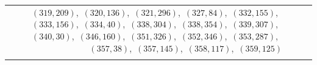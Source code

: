 \documentclass[11pt]{article}
\begin{document}
\begin{longtable}{@{}rrl>{\raggedright\arraybackslash}p{}@{}}
$(319,209)$,\allowbreak\ $(320,136)$,\allowbreak\ $(321,296)$,\allowbreak\ $(327,84)$,\allowbreak\ $(332,155)$,\allowbreak\ $(333,156)$,\allowbreak\ $(334,40)$,\allowbreak\ $(338,304)$,\allowbreak\ $(338,354)$,\allowbreak\ $(339,307)$,\allowbreak\ $(340,30)$,\allowbreak\ $(346,160)$,\allowbreak\ $(351,326)$,\allowbreak\ $(352,346)$,\allowbreak\ $(353,287)$,\allowbreak\ $(357,38)$,\allowbreak\ $(357,145)$,\allowbreak\ $(358,117)$,\allowbreak\ $(359,125)$\\
\addlinespace[3pt]
\end{longtable}
\endgroup
\end{document}
